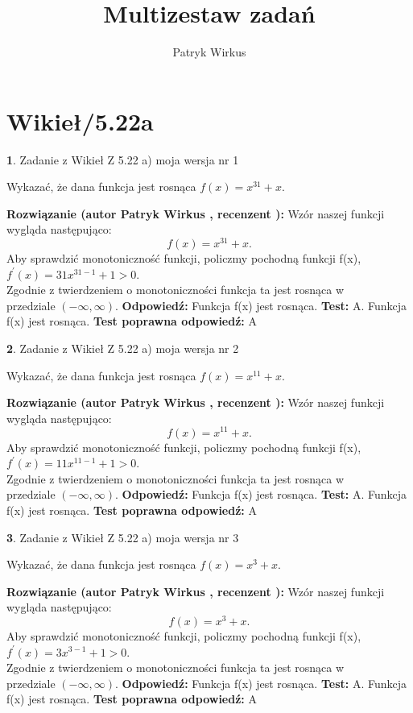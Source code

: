 \documentclass[12pt, a4paper]{article}
\title{Multizestaw zadań}
\author{Patryk Wirkus}
\date{}
\theoremstyle{definition} %
\newtheorem{zad}{}
\newcommand{\kategoria}[1]{\section{#1}}
\newcommand{\zadStart}[1]{\begin{zad}#1\newline}
\newcommand{\zadStop}{\end{zad}}
\newcommand{\rozwStart}[2]{\noindent \textbf{Rozwiązanie (autor #1 , recenzent #2): }\newline}
\newcommand{\rozwStop}{\newline}
\newcommand{\odpStart}{\noindent \textbf{Odpowiedź:}\newline}
\newcommand{\odpStop}{\newline}
\newcommand{\testStart}{\noindent \textbf{Test:}\newline}
\newcommand{\testStop}{\newline}
\newcommand{\kluczStart}{\noindent \textbf{Test poprawna odpowiedź:}\newline}
\newcommand{\kluczStop}{\newline}
\begin{document}
\maketitle

\kategoria{Wikieł/5.22a}


\zadStart{Zadanie z Wikieł Z 5.22 a) moja wersja nr 1}

Wykazać, że dana funkcja jest rosnąca $f(x) = x^{31}+x$.
\zadStop
\rozwStart{Patryk Wirkus}{}
Wzór naszej funkcji wygląda następująco:
$$f(x) = x^{31}+x.$$
Aby sprawdzić monotoniczność funkcji, policzmy pochodną funkcji f(x),\\ $f^{'}(x) = 31x^{31-1}+1 > 0$.\\
Zgodnie z twierdzeniem o monotoniczności funkcja ta jest rosnąca w\\ przedziale $(-\infty,\infty)$.
\rozwStop
\odpStart
Funkcja f(x) jest rosnąca.
\odpStop
\testStart
A. Funkcja f(x) jest rosnąca.
\testStop
\kluczStart
A
\kluczStop



\zadStart{Zadanie z Wikieł Z 5.22 a) moja wersja nr 2}

Wykazać, że dana funkcja jest rosnąca $f(x) = x^{11}+x$.
\zadStop
\rozwStart{Patryk Wirkus}{}
Wzór naszej funkcji wygląda następująco:
$$f(x) = x^{11}+x.$$
Aby sprawdzić monotoniczność funkcji, policzmy pochodną funkcji f(x),\\ $f^{'}(x) = 11x^{11-1}+1 > 0$.\\
Zgodnie z twierdzeniem o monotoniczności funkcja ta jest rosnąca w\\ przedziale $(-\infty,\infty)$.
\rozwStop
\odpStart
Funkcja f(x) jest rosnąca.
\odpStop
\testStart
A. Funkcja f(x) jest rosnąca.
\testStop
\kluczStart
A
\kluczStop



\zadStart{Zadanie z Wikieł Z 5.22 a) moja wersja nr 3}

Wykazać, że dana funkcja jest rosnąca $f(x) = x^{3}+x$.
\zadStop
\rozwStart{Patryk Wirkus}{}
Wzór naszej funkcji wygląda następująco:
$$f(x) = x^{3}+x.$$
Aby sprawdzić monotoniczność funkcji, policzmy pochodną funkcji f(x),\\ $f^{'}(x) = 3x^{3-1}+1 > 0$.\\
Zgodnie z twierdzeniem o monotoniczności funkcja ta jest rosnąca w\\ przedziale $(-\infty,\infty)$.
\rozwStop
\odpStart
Funkcja f(x) jest rosnąca.
\odpStop
\testStart
A. Funkcja f(x) jest rosnąca.
\testStop
\kluczStart
A
\kluczStop
\end{document}
